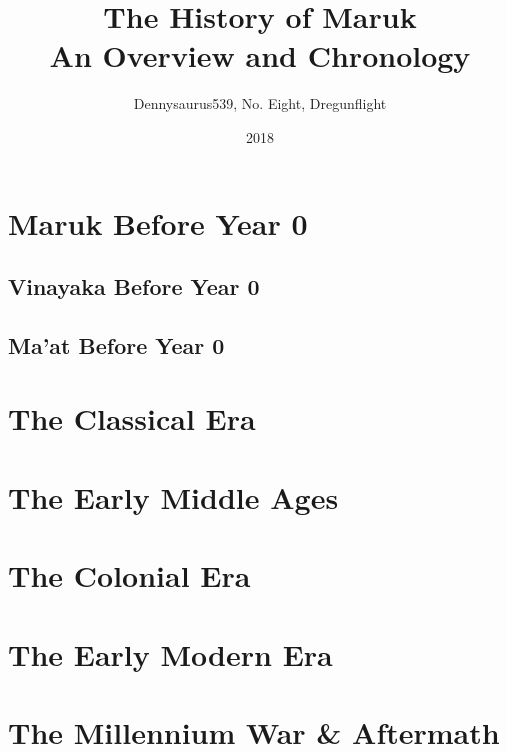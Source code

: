 \documentclass[a5paper, 11pt, openright, twoside]{book}
\title{The History of Maruk\\\large{An Overview and Chronology}}
\date{2018}
\author{Dennysaurus539, No. Eight, Dregunflight}
\begin{document}
	
	
	\part{Maruk Before Year 0}
	\chapter{Vinayaka Before Year 0}
	
	\chapter{Ma'at Before Year 0}
	
	\part{The Classical Era}
	\part{The Early Middle Ages}
	\part{The Colonial Era}
	\part{The Early Modern Era}
	\part{The Millennium War \& Aftermath} 
	\printindex
\end{document}
